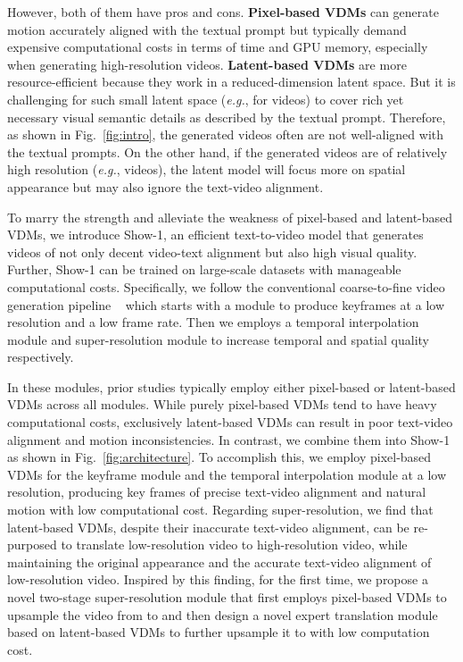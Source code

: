 \documentclass{article} \usepackage{iclr2024_conference,times}
\newcommand{\eg}{\textit{e.g.}}
\begin{document}
However, both of them have pros and cons. \textbf{Pixel-based VDMs} can generate motion accurately aligned with the textual prompt but typically demand expensive computational costs in terms of time and GPU memory, especially when generating high-resolution videos.
\textbf{Latent-based VDMs} are more resource-efficient because they work in a reduced-dimension latent space.
But it is challenging for such small latent space (\eg,  for  videos) to cover rich yet necessary visual semantic details as described by the textual prompt.
Therefore, as shown in Fig.~\ref{fig:intro}, the generated videos often are not well-aligned with the textual prompts. On the other hand, if the generated videos are of relatively high resolution (\eg,  videos), the latent model will focus more on spatial appearance but may also ignore the text-video alignment.









To marry the strength and alleviate the weakness of pixel-based and latent-based VDMs, we introduce Show-1, an efficient text-to-video model that generates videos of not only decent video-text alignment but also high visual quality. Further, Show-1 can be trained on large-scale datasets with manageable computational costs.
Specifically, we follow the conventional coarse-to-fine video generation pipeline ~\citep{ ho2022imagen, blattmann2023align} which starts with a  module to produce keyframes at a low resolution and a low frame rate. Then we employs a temporal interpolation module and super-resolution module to increase temporal and spatial quality respectively.

In these  modules, prior studies typically employ either pixel-based or latent-based VDMs across all modules. While purely pixel-based VDMs tend to have heavy computational costs, exclusively latent-based VDMs can result in poor text-video alignment and motion inconsistencies.
In contrast, we combine them into Show-1 as shown in Fig.~\ref{fig:architecture}. To accomplish this, we employ pixel-based VDMs for the keyframe module and the temporal interpolation module at a low resolution, producing key frames of precise text-video alignment and natural motion with low computational cost.
Regarding super-resolution, we find that latent-based VDMs, despite their inaccurate text-video alignment, can be re-purposed to translate low-resolution video to high-resolution video, while maintaining the original appearance and the accurate text-video alignment of low-resolution video.
Inspired by this finding, for the first time, we propose a novel two-stage super-resolution module that first employs pixel-based VDMs to upsample the video from  to  and then design a novel expert translation module based on latent-based VDMs to further upsample it to  with low computation cost.
\end{document}
